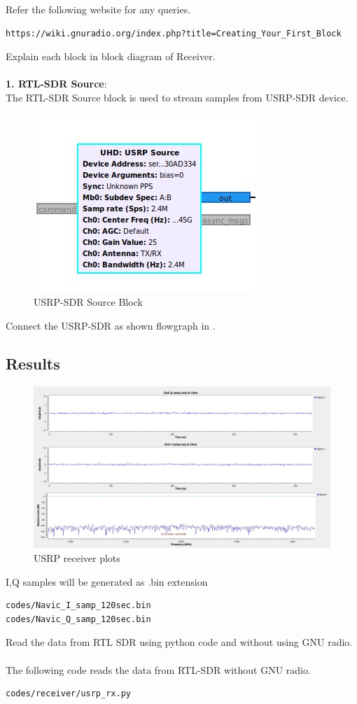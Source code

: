 Refer the following website for any queries.
\begin{lstlisting}
https://wiki.gnuradio.org/index.php?title=Creating_Your_First_Block
\end{lstlisting}
 Explain each block in block diagram of Receiver.\\
	\solution \\
\textbf{1. RTL-SDR Source}:\\
The RTL-SDR Source block is used to stream samples from USRP-SDR device.
\begin{figure}[H]
\centering
\includegraphics[width=0.4\columnwidth]{figs/usrp-sink.jpg}
\caption{USRP-SDR Source Block}
\label{fig:source block}
\end{figure}
Connect the USRP-SDR as shown flowgraph in .\\



\subsection{Results} 
\begin{figure}
\includegraphics[width=0.8\columnwidth]{figs/USRP_results.jpg}
\caption{USRP receiver plots}
\label{fig:plots}
\end{figure}

I,Q samples will be generated as .bin extension

\begin{lstlisting}
codes/Navic_I_samp_120sec.bin
codes/Navic_Q_samp_120sec.bin
\end{lstlisting}

Read the data from RTL SDR using python code and without using GNU radio.
\\
\solution \\
The following code reads the data from RTL-SDR without GNU radio.
\begin{lstlisting}
codes/receiver/usrp_rx.py
\end{lstlisting}
















